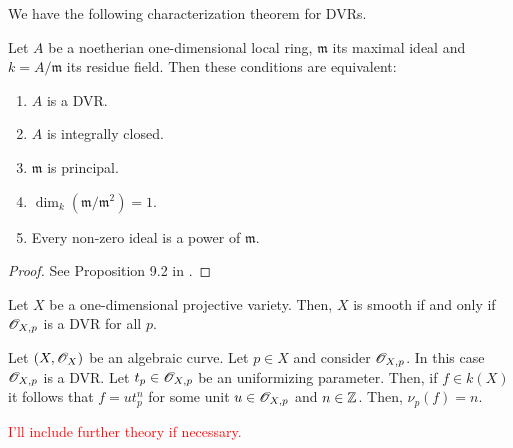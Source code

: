 We have the following characterization theorem for DVRs.
\begin{theorem}\label{thm:characterization-of-DVRs}
	Let $A$ be a noetherian one-dimensional local ring, $\mathfrak{m}$ its maximal ideal and $k = A/\mathfrak{m}$ its residue field. Then these conditions are equivalent:
	\begin{enumerate}[label = (\roman*)]
		\item $A$ is a DVR.
		\item $A$ is integrally closed.
		\item $\mathfrak{m}$ is principal.
		\item $\dim_{k}(\mathfrak{m}/\mathfrak{m}^{2}) = 1$.
		\item Every non-zero ideal is a power of $\mathfrak{m}$.
	\end{enumerate}
\end{theorem}
\begin{proof}
	See Proposition 9.2 in \cite{atiyah}.
\end{proof}
\begin{corollary}\label{cor:smoothness-DVR-curves}
	Let $X$ be a one-dimensional projective variety. Then, $X$ is smooth if and only if ${\mathscr O}_{X,p}$ is a DVR for all $p$.
\end{corollary}
\begin{example}\label{ex:stalk-of-regular-functions-as-a-DVR}
	Let $(X,{\mathscr O}_{X})$ be an algebraic curve. Let $p \in X$ and consider ${\mathscr O}_{X,p}$. In this case ${\mathscr O}_{X,p}$ is a DVR. Let $t_{p}\in {\mathscr O}_{X,p}$ be an uniformizing parameter. Then, if $f \in k(X)$ it follows that $f = ut_{p}^{n}$ for some  unit $u\in {\mathscr O}_{X,p}$ and $n \in {\mathbb Z}$. Then, $\nu_{p}(f) = n$.
\end{example}
\textcolor{red}{I'll include further theory if necessary.}
